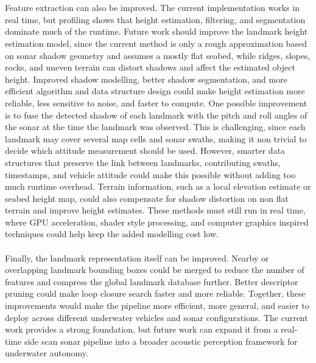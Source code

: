 \\ \\
Feature extraction can also be improved. The current implementation works in real time, but profiling shows that height estimation, filtering, and segmentation dominate much of the runtime. Future work should improve the landmark height estimation model, since the current method is only a rough approximation based on sonar shadow geometry and assumes a mostly flat seabed, while ridges, slopes, rocks, and uneven terrain can distort shadows and affect the estimated object height. Improved shadow modelling, better shadow segmentation, and more efficient algorithm and data structure design could make height estimation more reliable, less sensitive to noise, and faster to compute. One possible improvement is to fuse the detected shadow of each landmark with the pitch and roll angles of the sonar at the time the landmark was observed. This is challenging, since each landmark may cover several map cells and sonar swaths, making it non trivial to decide which attitude measurement should be used. However, smarter data structures that preserve the link between landmarks, contributing swaths, timestamps, and vehicle attitude could make this possible without adding too much runtime overhead. Terrain information, such as a local elevation estimate or seabed height map, could also compensate for shadow distortion on non flat terrain and improve height estimates. These methods must still run in real time, where GPU acceleration, shader style processing, and computer graphics inspired techniques could help keep the added modelling cost low.
\\ \\
Finally, the landmark representation itself can be improved. Nearby or overlapping landmark bounding boxes could be merged to reduce the number of features and compress the global landmark database further. Better descriptor pruning could make loop closure search faster and more reliable. Together, these improvements would make the pipeline more efficient, more general, and easier to deploy across different underwater vehicles and sonar configurations. The current work provides a strong foundation, but future work can expand it from a real-time side scan sonar pipeline into a broader acoustic perception framework for underwater autonomy.

